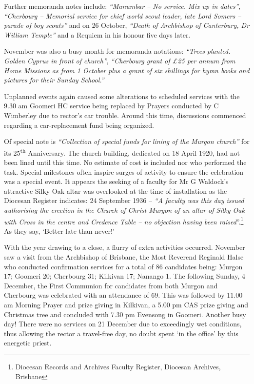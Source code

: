 Further memoranda notes include: \emph{``Manumbar -- No service. Mix up in dates''}, \emph{``Cherbourg -- Memorial service for chief world scout leader, late Lord Somers -- parade of boy scouts''} and on 26 October, \emph{``Death of Archbishop of Canterbury, Dr William Temple''} and a Requiem in his honour five days later.



November was also a busy month for memoranda notations: \emph{``Trees planted. Golden Cyprus in front of church''}, \emph{``Cherbourg grant of \pounds25 per annum from Home Missions as from 1 October plus a grant of six shillings for hymn books and pictures for their Sunday School.''}



Unplanned events again caused some alterations to scheduled services with the 9.30 am Goomeri HC service being replaced by Prayers conducted by C Wimberley due to rector's car trouble. Around this time, discussions commenced regarding a car-replacement fund being organized.



Of special note is \emph{``Collection of special funds for lining of the Murgon church''} for its 25\textsuperscript{th} Anniversary. The church building, dedicated on 18 April 1920, had not been lined until this time. No estimate of cost is included nor who performed the task. Special milestones often inspire surges of activity to ensure the celebration was a special event. It appears the seeking of a faculty for Mr G Waldock's attractive Silky Oak altar was overlooked at the time of installation as the Diocesan Register indicates: 24 September 1936 -- \emph{``A faculty was this day issued authorising the erection in the Church of Christ Murgon of an altar of Silky Oak with Cross in the centre and Credence Table -- no objection having been raised}''.\footnote{Diocesan Records and Archives Faculty Register, Diocesan Archives, Brisbane} As they say, `Better late than never!'


With the year drawing to a close, a flurry of extra activities occurred. November saw a visit from the Archbishop of Brisbane, the Most Reverend Reginald Halse who conducted confirmation services for a total of 86 candidates being: Murgon 17; Goomeri 20; Cherbourg 31; Kilkivan 17; Nanango 1. The following Sunday, 4 December, the First Communion for candidates from both Murgon and Cherbourg was celebrated with an attendance of 69. This was followed by 11.00 am Morning Prayer and prize giving in Kilkivan, a 5.00 pm CAS prize giving and Christmas tree and concluded with 7.30 pm Evensong in Goomeri. Another busy day! There were no services on 21 December due to exceedingly wet conditions, thus allowing the rector a travel-free day, no doubt spent `in the office' by this energetic priest.




